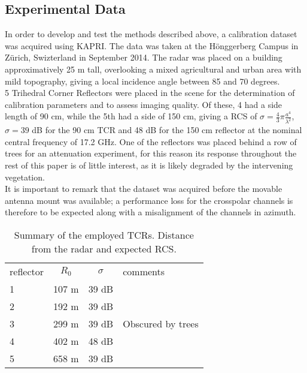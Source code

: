 \subsection{Experimental Data}\label{sec:data}
In order to develop and test the methods described above, a calibration dataset was acquired using KAPRI. The data was taken at the H\"{o}nggerberg Campus in Z\"{u}rich, Swizterland in September 2014. The radar was placed on a building approximatively 25 m tall, overlooking a mixed agricultural and urban area with mild topography, giving a local incidence angle between 85 and 70 degrees.\\ 5 Trihedral Corner Reflectors were placed in the scene for the determination of calibration parameters and to assess imaging quality. Of these, 4 had a side length of 90 cm, while the 5th had a side of 150 cm, giving a RCS of $\sigma=\frac{4}{3}\pi \frac{a^4}{\lambda^2}$, $\sigma= 39$ dB for the 90 cm TCR and 48 dB for the 150 cm reflector at the nominal central frequency of 17.2 GHz. One of the reflectors was placed behind a row of trees for an attenuation experiment, for this reason its response throughout the rest of this paper is of little interest, as it is likely degraded by the intervening vegetation.\\ It is important to remark that the dataset was acquired before the movable antenna mount was available; a performance loss for the crosspolar channels is therefore to be expected along with a misalignment of the channels in azimuth.
\begin{table}[ht]
	\begin{tabular}{lccl}
		\hline
		reflector & $R_0$ & $\sigma$ & comments\\
		1	& 107 m & 39 dB & \\
		2  & 192 m & 39 dB & \\
		3 & 299 m & 39 dB & Obscured by trees\\
		4 & 402 m & 48 dB &\\
		5 & 658 m & 39 dB&\\
		\hline
	\end{tabular}
	\caption{Summary of the employed TCRs. Distance from the radar and expected RCS.}
	\label{tab:reflectors}
\end{table}



